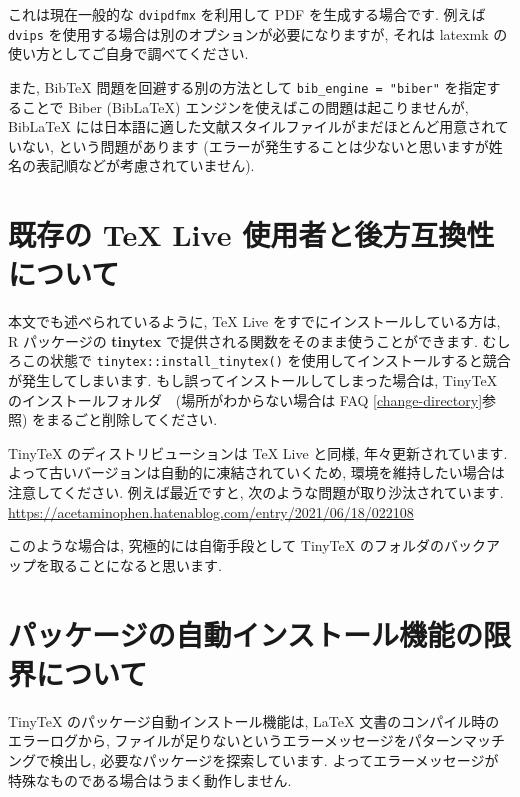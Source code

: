 \documentclass[
  xelatex,ja=standard,jafont=noto]{bxjsreport}
\begin{document}
これは現在一般的な \texttt{dvipdfmx} を利用して PDF を生成する場合です.
例えば \texttt{dvips} を使用する場合は別のオプションが必要になりますが,
それは latexmk の使い方としてご自身で調べてください.

また, BibTeX 問題を回避する別の方法として
\texttt{bib\_engine\ =\ "biber"} を指定することで Biber (BibLaTeX)
エンジンを使えばこの問題は起こりませんが, BibLaTeX
には日本語に適した文献スタイルファイルがまだほとんど用意されていない,
という問題があります
(エラーが発生することは少ないと思いますが姓名の表記順などが考慮されていません).

\hypertarget{ux65e2ux5b58ux306e-tex-live-ux4f7fux7528ux8005ux3068ux5f8cux65b9ux4e92ux63dbux6027ux306bux3064ux3044ux3066}{%
\section{既存の TeX Live
使用者と後方互換性について}\label{ux65e2ux5b58ux306e-tex-live-ux4f7fux7528ux8005ux3068ux5f8cux65b9ux4e92ux63dbux6027ux306bux3064ux3044ux3066}}

本文でも述べられているように, TeX Live をすでにインストールしている方は,
R パッケージの \textbf{tinytex}
で提供される関数をそのまま使うことができます. むしろこの状態で
\texttt{tinytex::install\_tinytex()}
を使用してインストールすると競合が発生してしまいます.
もし誤ってインストールしてしまった場合は, TinyTeX
のインストールフォルダ　(場所がわからない場合は FAQ
\ref{change-directory}参照) をまるごと削除してください.

TinyTeX のディストリビューションは TeX Live と同様,
年々更新されています. よって古いバージョンは自動的に凍結されていくため,
環境を維持したい場合は注意してください. 例えば最近ですと,
次のような問題が取り沙汰されています.
\url{https://acetaminophen.hatenablog.com/entry/2021/06/18/022108}

このような場合は, 究極的には自衛手段として TinyTeX
のフォルダのバックアップを取ることになると思います.

\hypertarget{ux30d1ux30c3ux30b1ux30fcux30b8ux306eux81eaux52d5ux30a4ux30f3ux30b9ux30c8ux30fcux30ebux6a5fux80fdux306eux9650ux754cux306bux3064ux3044ux3066}{%
\section{パッケージの自動インストール機能の限界について}\label{ux30d1ux30c3ux30b1ux30fcux30b8ux306eux81eaux52d5ux30a4ux30f3ux30b9ux30c8ux30fcux30ebux6a5fux80fdux306eux9650ux754cux306bux3064ux3044ux3066}}

TinyTeX のパッケージ自動インストール機能は, LaTeX
文書のコンパイル時のエラーログから,
ファイルが足りないというエラーメッセージをパターンマッチングで検出し,
必要なパッケージを探索しています.
よってエラーメッセージが特殊なものである場合はうまく動作しません.
\end{document}
